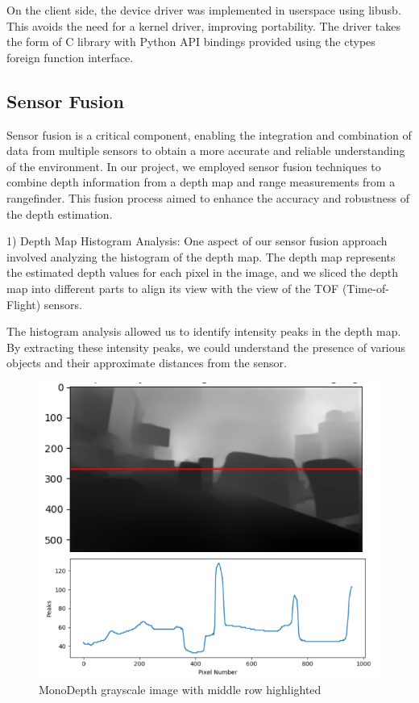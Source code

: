 \documentclass[conference]{IEEEtran}
\begin{document}
\FloatBarrier

On the client side, the device driver was implemented in userspace using
libusb. This avoids the need for a kernel driver, improving portability. The
driver takes the form of C library with Python API bindings provided using
the ctypes foreign function interface.

\subsection{Sensor Fusion}
Sensor fusion is a critical component, enabling the integration and combination of data from multiple sensors to obtain a more accurate and reliable understanding of the environment. In our project, we employed sensor fusion techniques to combine depth information from a depth map and range measurements from a rangefinder. This fusion process aimed to enhance the accuracy and robustness of the depth estimation.

1) Depth Map Histogram Analysis:
One aspect of our sensor fusion approach involved analyzing the histogram of the depth map. The depth map represents the estimated depth values for each pixel in the image, and we sliced the depth map into different parts to align its view with the view of the TOF (Time-of-Flight) sensors. 

The histogram analysis allowed us to identify intensity peaks in the depth map. By extracting these intensity peaks, we could understand the presence of various objects and their approximate distances from the sensor.

\begin{figure}
\centering
\includegraphics[scale=0.40]{fusion-histogram.png}
\caption{MonoDepth grayscale image with middle row highlighted}
\label{fig:fusion-histogram}
\end{figure}
\end{document}
